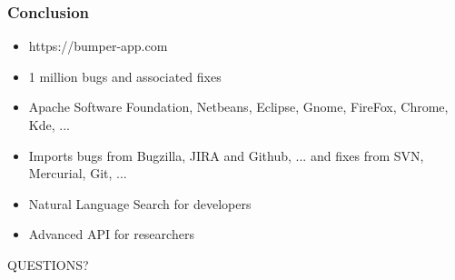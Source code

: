 \documentclass{beamer}
\begin{document}
\begin{frame}
\frametitle{Conclusion}

\begin{itemize}
\item https://bumper-app.com
\item 1 million bugs and associated fixes
\item Apache Software Foundation, Netbeans, Eclipse, Gnome, FireFox, Chrome, Kde, ...
\item Imports bugs from Bugzilla, JIRA and Github, ... and fixes from SVN, Mercurial, Git, ...
\item Natural Language Search for developers
\item Advanced API for researchers
\end{itemize}



\end{frame}




\begin{frame}
\Huge{\centerline{QUESTIONS?}}
\end{frame}

\end{document}
